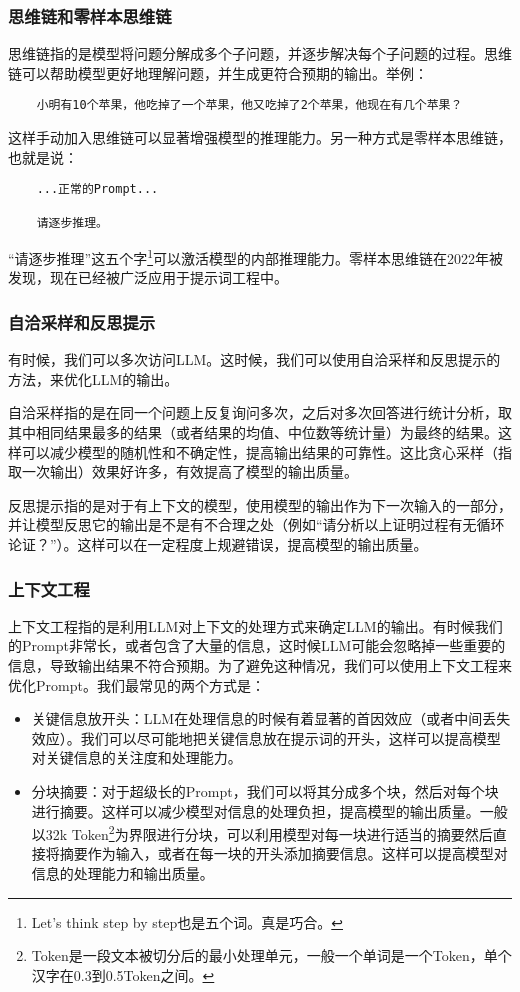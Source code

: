 \subsubsection{思维链和零样本思维链}

思维链指的是模型将问题分解成多个子问题，并逐步解决每个子问题的过程。思维链可以帮助模型更好地理解问题，并生成更符合预期的输出。举例：

\begin{lstlisting}
    小明有10个苹果，他吃掉了一个苹果，他又吃掉了2个苹果，他现在有几个苹果？
\end{lstlisting}

这样手动加入思维链可以显著增强模型的推理能力。另一种方式是零样本思维链，也就是说：
\begin{lstlisting}
    ...正常的Prompt...

    请逐步推理。
\end{lstlisting}
“请逐步推理”这五个字\footnote{Let's think step by step也是五个词。真是巧合。}可以激活模型的内部推理能力。零样本思维链在2022年被发现，现在已经被广泛应用于提示词工程中。

\subsubsection{自洽采样和反思提示}

有时候，我们可以多次访问LLM。这时候，我们可以使用自洽采样和反思提示的方法，来优化LLM的输出。

自洽采样指的是在同一个问题上反复询问多次，之后对多次回答进行统计分析，取其中相同结果最多的结果（或者结果的均值、中位数等统计量）为最终的结果。这样可以减少模型的随机性和不确定性，提高输出结果的可靠性。这比贪心采样（指取一次输出）效果好许多，有效提高了模型的输出质量。

反思提示指的是对于有上下文的模型，使用模型的输出作为下一次输入的一部分，并让模型反思它的输出是不是有不合理之处（例如“请分析以上证明过程有无循环论证？”）。这样可以在一定程度上规避错误，提高模型的输出质量。

\subsubsection{上下文工程}

上下文工程指的是利用LLM对上下文的处理方式来确定LLM的输出。有时候我们的Prompt非常长，或者包含了大量的信息，这时候LLM可能会忽略掉一些重要的信息，导致输出结果不符合预期。为了避免这种情况，我们可以使用上下文工程来优化Prompt。我们最常见的两个方式是：
\begin{itemize}
  \item 关键信息放开头：LLM在处理信息的时候有着显著的首因效应（或者中间丢失效应）。我们可以尽可能地把关键信息放在提示词的开头，这样可以提高模型对关键信息的关注度和处理能力。
  \item 分块摘要：对于超级长的Prompt，我们可以将其分成多个块，然后对每个块进行摘要。这样可以减少模型对信息的处理负担，提高模型的输出质量。一般以32k Token\footnote{Token是一段文本被切分后的最小处理单元，一般一个单词是一个Token，单个汉字在0.3到0.5Token之间。}为界限进行分块，可以利用模型对每一块进行适当的摘要然后直接将摘要作为输入，或者在每一块的开头添加摘要信息。这样可以提高模型对信息的处理能力和输出质量。
\end{itemize}

